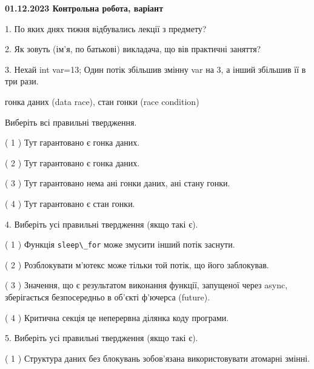 \documentclass[12pt, ukrainian]{article}
\def\code#1{\Verb!#1!}
\begin{document}
\vspace{4mm}
\newpage
\begin {large}

\textbf{01.12.2023 Контрольна робота, варіант  }\par


{
1. По яких днях тижня відбувались лекції з предмету?



\vspace{5mm}
2. Як зовуть (ім'я, по батькові) викладача, що вів практичні заняття?



\vspace{5mm}
3. Нехай int var=13; Один потік збільшив змінну var на 3, а інший збільшив її в три рази.

гонка даних (data race), стан гонки (race condition)

Виберіть всі правильні твердження.\par
\vspace{2mm}
( 1 ) Тут гарантовано є гонка даних.%

( 2 ) Тут гарантовано є гонка даних.%

( 3 ) Тут гарантовано нема ані гонки даних, ані стану гонки.%

( 4 ) Тут гарантовано є стан гонки.%


\vspace{5mm}
4. Виберіть усі правильні твердження (якщо такі є).\par
\vspace{2mm}

( 1 ) Функція \code{sleep\_for} може змусити інший потік заснути.%

( 2 ) Розблокувати м’ютекс може тільки той потік, що його заблокував.%

( 3 ) Значення, що є результатом виконання функції, запущеної через async, зберігається безпосередньо в об’єкті ф’ючерса (future).%

( 4 ) Критична секція це неперервна ділянка коду програми.%


\vspace{5mm}
5. Виберіть усі правильні твердження (якщо такі є).\par
\vspace{2mm}

( 1 ) Структура даних без блокувань зобов’язана використовувати атомарні змінні.%

}
\end{large}
\end{document}
